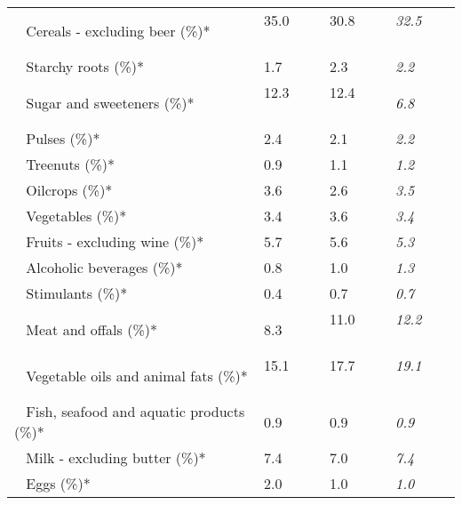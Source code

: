 \begin{tabular}{L{3.9cm} R{1cm} R{1cm} R{1cm}}
	 ~ Cereals - excluding beer (\%)* & 35.0 ~ \ \ & 30.8 ~ \ \ & \textit{32.5} ~ \ \ \\ 
	 ~ Starchy roots (\%)* & 1.7 ~ \ \ & 2.3 ~ \ \ & \textit{2.2} ~ \ \ \\ 
	 ~ Sugar and sweeteners (\%)* & 12.3 ~ \ \ & 12.4 ~ \ \ & \textit{6.8} ~ \ \ \\ 
	 ~ Pulses (\%)* & 2.4 ~ \ \ & 2.1 ~ \ \ & \textit{2.2} ~ \ \ \\ 
	 ~ Treenuts (\%)* & 0.9 ~ \ \ & 1.1 ~ \ \ & \textit{1.2} ~ \ \ \\ 
	 ~ Oilcrops (\%)* & 3.6 ~ \ \ & 2.6 ~ \ \ & \textit{3.5} ~ \ \ \\ 
	 ~ Vegetables (\%)* & 3.4 ~ \ \ & 3.6 ~ \ \ & \textit{3.4} ~ \ \ \\ 
	 ~ Fruits - excluding wine (\%)* & 5.7 ~ \ \ & 5.6 ~ \ \ & \textit{5.3} ~ \ \ \\ 
	 ~ Alcoholic beverages (\%)* & 0.8 ~ \ \ & 1.0 ~ \ \ & \textit{1.3} ~ \ \ \\ 
	 ~ Stimulants (\%)* & 0.4 ~ \ \ & 0.7 ~ \ \ & \textit{0.7} ~ \ \ \\ 
	 ~ Meat and offals (\%)* & 8.3 ~ \ \ & 11.0 ~ \ \ & \textit{12.2} ~ \ \ \\ 
	 ~ Vegetable oils and animal fats (\%)* & 15.1 ~ \ \ & 17.7 ~ \ \ & \textit{19.1} ~ \ \ \\ 
	 ~ Fish, seafood and aquatic products (\%)* & 0.9 ~ \ \ & 0.9 ~ \ \ & \textit{0.9} ~ \ \ \\ 
	 ~ Milk - excluding butter (\%)* & 7.4 ~ \ \ & 7.0 ~ \ \ & \textit{7.4} ~ \ \ \\ 
	 ~ Eggs (\%)* & 2.0 ~ \ \ & 1.0 ~ \ \ & \textit{1.0} ~ \ \ \\ 
       \toprule
      \end{tabular}
      \clearpage
{}
